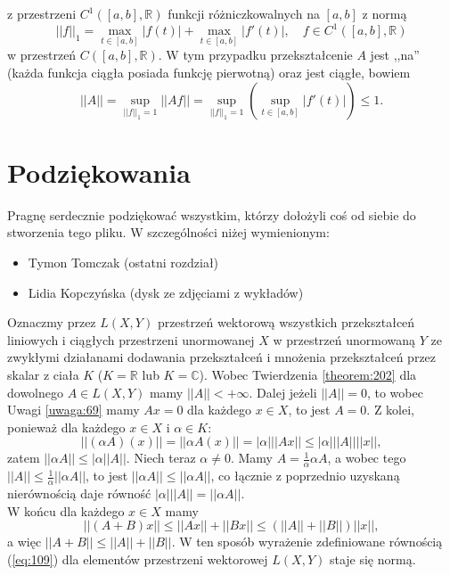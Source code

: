 \documentclass[leqno]{article}
\begin{document}
\begin{justify}
\begin{ex}
\begin{itemize}
            z przestrzeni $C^1([a,b], \mathbb{R})$ funkcji różniczkowalnych na $[a,b]$ z normą 
            \[
                ||f||_1 = \max_{t \in [a,b]}|f(t)| + \max_{t \in [a,b]}|f'(t)|, \quad f \in C^1([a,b], \mathbb{R})
            \]
            w przestrzeń $C([a,b], \mathbb{R})$. W tym przypadku przekształcenie $A$ jest ,,na'' (każda funkcja ciągła
            posiada funkcję pierwotną) oraz jest ciągłe, bowiem 
            \[
                ||A|| = \sup_{||f||_1 = 1}||Af|| = \sup_{||f||_1 = 1}(\sup_{t \in [a,b]}|f'(t)|) \leqslant 1.
            \]
    \end{itemize}
\end{ex}

\section*{Podziękowania}

Pragnę serdecznie podziękować wszystkim, którzy dołożyli coś od siebie do stworzenia tego pliku. W szczególności niżej wymienionym:
\begin{itemize}
    \item Tymon Tomczak (ostatni rozdział)
    \item Lidia Kopczyńska (dysk ze zdjęciami z wykładów)
\end{itemize}

\begin{ex}
    Oznaczmy przez $L(X,Y)$ przestrzeń wektorową wszystkich przekształceń liniowych i ciągłych przestrzeni unormowanej $X$ w przestrzeń
    unormowaną $Y$ ze zwykłymi działanami dodawania przekształceń i mnożenia przekształceń przez skalar z ciała $K$ ($K=\mathbb{R}$ lub $K = \mathbb{C}$).
    Wobec Twierdzenia \ref{theorem:202} dla dowolnego $A \in L(X, Y)$ mamy $||A|| < +\infty$. Dalej jeżeli $||A|| = 0$, to wobec Uwagi \ref{uwaga:69} mamy
    $Ax = 0$ dla każdego $x \in X$, to jest $A = 0$. Z kolei, ponieważ dla każdego $x \in X$ i $\alpha \in K$:
    \[
        ||(\alpha A)(x)|| = ||\alpha A(x)|| = |\alpha|||Ax|| \leqslant |\alpha|||A||||x||,
    \]
    zatem $||\alpha A|| \leqslant |\alpha||A||$. Niech teraz $\alpha \neq 0$. Mamy $A = \frac{1}{\alpha}\alpha A$, a wobec tego
    $||A|| \leqslant \frac{1}{\alpha}||\alpha A||$, to jest $||\alpha A|| \leqslant ||\alpha A||$, co łącznie z poprzednio uzyskaną nierównością daje
    równość $|\alpha|||A|| = ||\alpha A||$. \\
    W końcu dla każdego $x \in X$ mamy 
    \[
        ||(A+B)x|| \leqslant ||Ax|| + ||Bx|| \leqslant (||A|| + ||B||)||x||,
    \]
    a więc $||A+B|| \leqslant ||A|| + ||B||$. W ten sposób wyrażenie zdefiniowane równością (\ref{eq:109}) dla elementów przestrzeni wektorowej
    $L(X, Y)$ staje się normą. 
\end{ex}


\end{justify}
\end{document}
